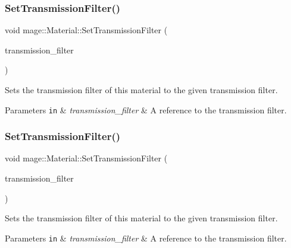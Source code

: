 \subsubsection{\texorpdfstring{Set\+Transmission\+Filter()}{SetTransmissionFilter()}\hspace{0.1cm}{\footnotesize\ttfamily [1/2]}}
{\footnotesize\ttfamily void mage\+::\+Material\+::\+Set\+Transmission\+Filter (\begin{DoxyParamCaption}\item[{const \hyperlink{structmage_1_1_r_g_b_spectrum}{R\+G\+B\+Spectrum} \&}]{transmission\+\_\+filter }\end{DoxyParamCaption})\hspace{0.3cm}{\ttfamily [noexcept]}}

Sets the transmission filter of this material to the given transmission filter.


\begin{DoxyParams}[1]{Parameters}
\mbox{\tt in}  & {\em transmission\+\_\+filter} & A reference to the transmission filter. \\
\hline
\end{DoxyParams}
\hypertarget{structmage_1_1_material_abc6f63bd40b00c81bc799ef1f2ca01e9}{}\label{structmage_1_1_material_abc6f63bd40b00c81bc799ef1f2ca01e9} 
\subsubsection{\texorpdfstring{Set\+Transmission\+Filter()}{SetTransmissionFilter()}\hspace{0.1cm}{\footnotesize\ttfamily [2/2]}}
{\footnotesize\ttfamily void mage\+::\+Material\+::\+Set\+Transmission\+Filter (\begin{DoxyParamCaption}\item[{\hyperlink{structmage_1_1_r_g_b_spectrum}{R\+G\+B\+Spectrum} \&\&}]{transmission\+\_\+filter }\end{DoxyParamCaption})\hspace{0.3cm}{\ttfamily [noexcept]}}

Sets the transmission filter of this material to the given transmission filter.


\begin{DoxyParams}[1]{Parameters}
\mbox{\tt in}  & {\em transmission\+\_\+filter} & A reference to the transmission filter. \\
\hline
\end{DoxyParams}
\hypertarget{structmage_1_1_material_a32525508f9083fd0336e92146083d822}{}\label{structmage_1_1_material_a32525508f9083fd0336e92146083d822} 
